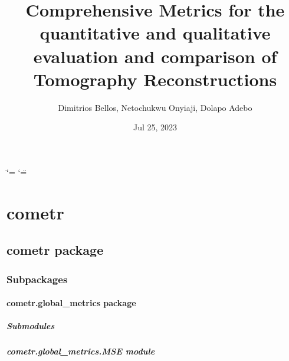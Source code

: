 \documentclass[letterpaper,10pt,english]{sphinxmanual}
\title{Comprehensive Metrics for the quantitative and qualitative evaluation and comparison of Tomography Reconstructions}
\date{Jul 25, 2023}
\author{Dimitrios Bellos, Netochukwu Onyiaji, Dolapo Adebo}
\begin{document}
\ifdefined\shorthandoff
  \ifnum\catcode`\=\string=\active\shorthandoff{=}\fi
  \ifnum\catcode`\"=\active{}\fi
\fi

\pagestyle{empty}
\sphinxmaketitle
\pagestyle{plain}
\sphinxtableofcontents
\pagestyle{normal}
\label{\detokenize{index::doc}}


\sphinxstepscope


\chapter{cometr}
\label{\detokenize{modules:cometr}}\label{\detokenize{modules::doc}}
\sphinxstepscope


\section{cometr package}
\label{\detokenize{cometr:cometr-package}}\label{\detokenize{cometr::doc}}

\subsection{Subpackages}
\label{\detokenize{cometr:subpackages}}
\sphinxstepscope


\subsubsection{cometr.global\_metrics package}
\label{\detokenize{cometr.global_metrics:cometr-global-metrics-package}}\label{\detokenize{cometr.global_metrics::doc}}

\paragraph{Submodules}
\label{\detokenize{cometr.global_metrics:submodules}}

\paragraph{cometr.global\_metrics.MSE module}
\label{\detokenize{cometr.global_metrics:module-cometr.global_metrics.MSE}}\label{\detokenize{cometr.global_metrics:cometr-global-metrics-mse-module}}
\end{document}
